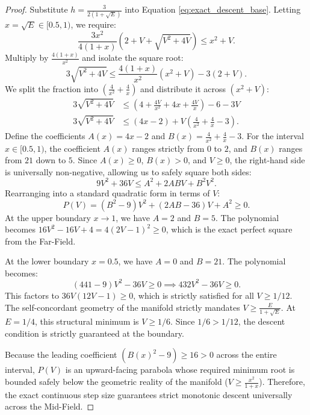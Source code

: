 \begin{proof}
Substitute $h = \frac{3}{2(1+\sqrt{E})}$ into Equation \ref{eq:exact_descent_base}. Letting $x = \sqrt{E} \in [0.5, 1)$, we require:
\begin{equation}
    \frac{3x^2}{4(1+x)} \left( 2 + V + \sqrt{V^2+4V} \right) \le x^2+V.
\end{equation}
Multiply by $\frac{4(1+x)}{x^2}$ and isolate the square root:
\begin{equation}
    3\sqrt{V^2+4V} \le \frac{4(1+x)}{x^2}(x^2+V) - 3(2+V).
\end{equation}
We split the fraction into $\left( \frac{4}{x^2} + \frac{4}{x} \right)$ and distribute it across $(x^2+V)$:
\begin{align}
    3\sqrt{V^2+4V} &\le \left( 4 + \frac{4V}{x^2} + 4x + \frac{4V}{x} \right) - 6 - 3V \nonumber \\
    3\sqrt{V^2+4V} &\le (4x - 2) + V\left( \frac{4}{x^2} + \frac{4}{x} - 3 \right). \label{eq:mid_field_linear}
\end{align}
Define the coefficients $A(x) = 4x - 2$ and $B(x) = \frac{4}{x^2} + \frac{4}{x} - 3$. 
For the interval $x \in [0.5, 1)$, the coefficient $A(x)$ ranges strictly from $0$ to $2$, and $B(x)$ ranges from $21$ down to $5$. Since $A(x) \ge 0$, $B(x) > 0$, and $V \ge 0$, the right-hand side is universally non-negative, allowing us to safely square both sides:
\begin{equation}
    9V^2 + 36V \le A^2 + 2ABV + B^2V^2.
\end{equation}
Rearranging into a standard quadratic form in terms of $V$:
\begin{equation}
    P(V) = (B^2 - 9)V^2 + (2AB - 36)V + A^2 \ge 0.
\end{equation}
At the upper boundary $x \to 1$, we have $A=2$ and $B=5$. The polynomial becomes $16V^2 - 16V + 4 = 4(2V-1)^2 \ge 0$, which is the exact perfect square from the Far-Field. 

At the lower boundary $x = 0.5$, we have $A=0$ and $B=21$. The polynomial becomes:
\begin{equation}
    (441 - 9)V^2 - 36V \ge 0 \implies 432V^2 - 36V \ge 0.
\end{equation}
This factors to $36V(12V - 1) \ge 0$, which is strictly satisfied for all $V \ge 1/12$. The self-concordant geometry of the manifold strictly mandates $V \ge \frac{E}{1+\sqrt{E}}$. At $E=1/4$, this structural minimum is $V \ge 1/6$. Since $1/6 > 1/12$, the descent condition is strictly guaranteed at the boundary. 

Because the leading coefficient $(B(x)^2-9) \ge 16 > 0$ across the entire interval, $P(V)$ is an upward-facing parabola whose required minimum root is bounded safely below the geometric reality of the manifold ($V \ge \frac{x^2}{1+x}$). Therefore, the exact continuous step size guarantees strict monotonic descent universally across the Mid-Field.


\end{proof}
